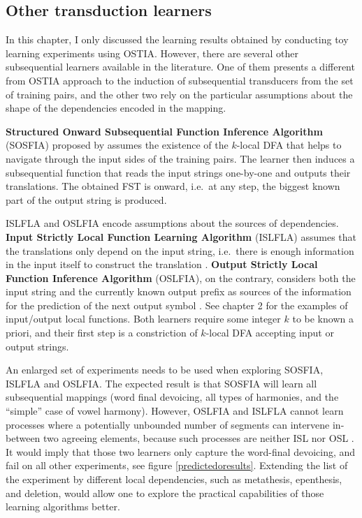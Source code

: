 \subsection{Other transduction learners}

In this chapter, I only discussed the learning results obtained by conducting toy learning experiments using OSTIA.
However, there are several other subsequential learners available in the literature.
One of them presents a different from OSTIA approach to the induction of subsequential transducers from the set of training pairs, and the other two rely on the particular assumptions about the shape of the dependencies encoded in the mapping.

\textbf{Structured Onward Subsequential Function Inference Algorithm} (SOSFIA) proposed by \cite{JardineEtAl2014} assumes the existence of the $k$-local DFA that helps to navigate through the input sides of the training pairs.
The learner then induces a subsequential function that reads the input strings one-by-one and outputs their translations.
The obtained FST is onward, i.e.\ at any step, the biggest known part of the output string is produced.


ISLFLA and OSLFIA encode assumptions about the sources of dependencies.
\textbf{Input Strictly Local Function Learning Algorithm} (ISLFLA) assumes that the translations only depend on the input string, i.e.\ there is enough information in the input itself to construct the translation \citep{ChandleeEtAl2014}.
\textbf{Output Strictly Local Function Inference Algorithm} (OSLFIA), on the contrary, considers both the input string and the currently known output prefix as sources of the information for the prediction of the next output symbol \citep{ChandleeEtAl2015}.
See chapter 2 for the examples of input/output local functions.
Both learners require some integer $k$ to be known a priori, and their first step is a constriction of $k$-local DFA accepting input or output strings.

An enlarged set of experiments needs to be used when exploring SOSFIA, ISLFLA and OSLFIA.
The expected result is that SOSFIA will learn all subsequential mappings (word final devoicing, all types of harmonies, and the ``simple'' case of vowel harmony).
However, OSLFIA and ISLFLA cannot learn processes where a potentially unbounded number of segments can intervene in-between two agreeing elements, because such processes are neither ISL nor OSL \citep{ChandleeEtAl2015}.
It would imply that those two learners only capture the word-final devoicing, and fail on all other experiments, see figure \ref{predictedoresults}.
Extending the list of the experiment by different local dependencies, such as metathesis, epenthesis, and deletion, would allow one to explore the practical capabilities of those learning algorithms better.



